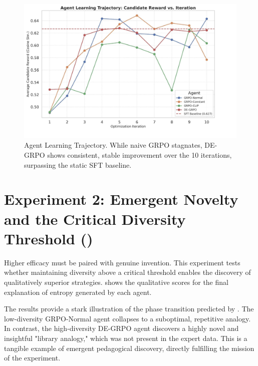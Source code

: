 \begin{figure}[htbp]
    \centering
    \includegraphics[width=0.9\linewidth]{i1.png}
    \caption{Agent Learning Trajectory. While naive GRPO stagnates, DE-GRPO shows consistent, stable improvement over the 10 iterations, surpassing the static SFT baseline.}
    \label{fig:learning_trajectory}
\end{figure}

\section{Experiment 2: Emergent Novelty and the Critical Diversity Threshold ()}

Higher efficacy must be paired with genuine invention. This experiment tests whether maintaining diversity above a critical threshold enables the discovery of qualitatively superior strategies.  shows the qualitative scores for the final explanation of entropy generated by each agent.

The results provide a stark illustration of the phase transition predicted by . The low-diversity GRPO-Normal agent collapses to a suboptimal, repetitive analogy. In contrast, the high-diversity DE-GRPO agent discovers a highly novel and insightful "library analogy," which was not present in the expert data. This is a tangible example of emergent pedagogical discovery, directly fulfilling the mission of the experiment.

